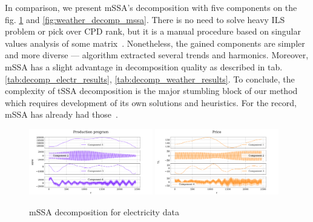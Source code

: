 \documentclass[referee, pdflatex]{sn-jnl}
\theoremstyle{definition}
\theoremstyle{plain}
\begin{document}
	In comparison, we present mSSA's decomposition with five components on the fig. \ref{fig:electr_decomp_mssa} and \ref{fig:weather_decomp_mssa}. There is no need to solve heavy ILS problem or pick over CPD rank, but it is a manual procedure based on singular values analysis of some matrix~\cite{ecfb9dc578be43ae9ee8fc88b8ff9151}. Nonetheless, the gained  components are simpler and more diverse --- algorithm extracted several trends and harmonics. Moreover, mSSA has a slight advantage in decomposition quality as described in tab. \ref{tab:decomp_electr_results}, \ref{tab:decomp_weather_results}. To conclude, the complexity of tSSA decomposition is the major stumbling block of our method which requires development of its own solutions and heuristics. For the record, mSSA has already had those~\cite{ecfb9dc578be43ae9ee8fc88b8ff9151}.
	
	\begin{figure}[h]
		\centering
		\includegraphics[width=0.48\textwidth, keepaspectratio]{../../experiments/electricity/mssa/figs/decomposition/manual/grouping_1/Production_program.png}
		\includegraphics[width=0.48\textwidth, keepaspectratio]{../../experiments/electricity/mssa/figs/decomposition/manual/grouping_1/Price.png}
		\caption{mSSA decomposition for electricity data}\label{fig:electr_decomp_mssa}
	\end{figure}
	
\end{document}
